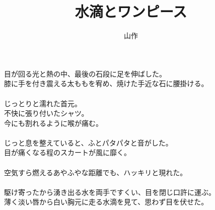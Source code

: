 \documentclass[a5j,12pt]{tbook}
\title{水滴とワンピース}
\author{\rensuji{J}山\rensuji{B}作}
\date{}
\begin{document}
\maketitle

目が回る光と熱の中、最後の石段に足を伸ばした。\\
膝に手を付き震える太ももを宥め、焼けた手近な石に腰掛ける。 \\
\\
じっとりと濡れた首元。\\
不快に張り付いたシャツ。\\
今にも割れるように喉が痛む。\\
\\
じっと息を整えていると、ふとパタパタと音がした。\\
目が痛くなる程のスカートが風に靡く。\\
\\
空気すら燃えるあやふやな距離でも、ハッキリと現れた。\\
\\
駆け寄ったから湧き出る水を両手ですくい、目を閉じ口許に運ぶ。\\
薄く淡い唇から白い胸元に走る水滴を見て、思わず目を伏せた。
\end{document}
